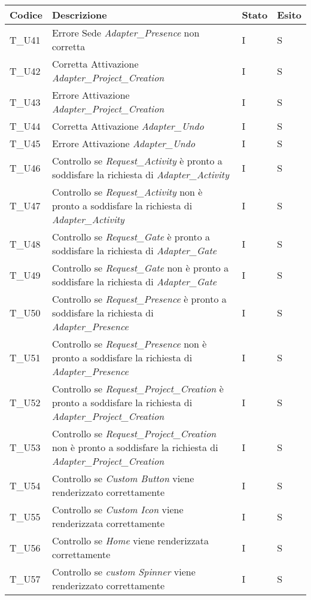 \begin{center}
\begin{tabular}{ |m{3em}|m{23em}|m{3em}|m{3em}| }
      \hline
      \textbf{Codice} & \textbf{Descrizione}  & \textbf{Stato} & \textbf{Esito}\\
      \hline
      T\_U41 & Errore Sede \textit{Adapter\_Presence} non corretta  & I & S \\
      \hline 
      T\_U42 & Corretta Attivazione \textit{Adapter\_Project\_Creation } & I & S\\
      \hline
      T\_U43 & Errore Attivazione \textit{Adapter\_Project\_Creation } & I & S \\
      \hline
      T\_U44 & Corretta Attivazione \textit{Adapter\_Undo } & I & S \\
      \hline
      T\_U45 & Errore Attivazione \textit{Adapter\_Undo } & I & S\\
      \hline
      T\_U46 & Controllo se \textit{Request\_Activity} è pronto a soddisfare la richiesta di \textit{Adapter\_Activity}  & I & S \\
      \hline
      T\_U47 & Controllo se \textit{Request\_Activity} non è pronto a soddisfare la richiesta di \textit{Adapter\_Activity}  & I & S \\
      \hline
      T\_U48 & Controllo se \textit{Request\_Gate} è pronto a soddisfare la richiesta di \textit{Adapter\_Gate}  & I & S\\
      \hline
      T\_U49 & Controllo se \textit{Request\_Gate} non è pronto a soddisfare la richiesta di \textit{Adapter\_Gate}  & I & S \\
      \hline
      T\_U50 & Controllo se \textit{Request\_Presence} è pronto a soddisfare la richiesta di \textit{Adapter\_Presence}  & I & S\\
      \hline
      T\_U51 &Controllo se \textit{Request\_Presence} non è pronto a soddisfare la richiesta di \textit{Adapter\_Presence}  & I & S\\
      \hline
      T\_U52 & Controllo se \textit{Request\_Project\_Creation} è pronto a soddisfare la richiesta di \textit{Adapter\_Project\_Creation}  & I & S\\
      \hline
      T\_U53 & Controllo se \textit{Request\_Project\_Creation} non è pronto a soddisfare la richiesta di \textit{Adapter\_Project\_Creation}  & I & S \\
      \hline
      T\_U54 & Controllo se \textit{Custom Button} viene renderizzato correttamente & I & S \\
      \hline
      T\_U55 & Controllo se \textit{Custom Icon} viene renderizzata correttamente & I & S\\
      \hline
      T\_U56 & Controllo se \textit{Home} viene renderizzata correttamente & I & S\\
      \hline
      T\_U57 & Controllo se \textit{custom Spinner} viene renderizzato correttamente & I & S  \\
      \hline
\end{tabular}
\end{center}
\newpage
